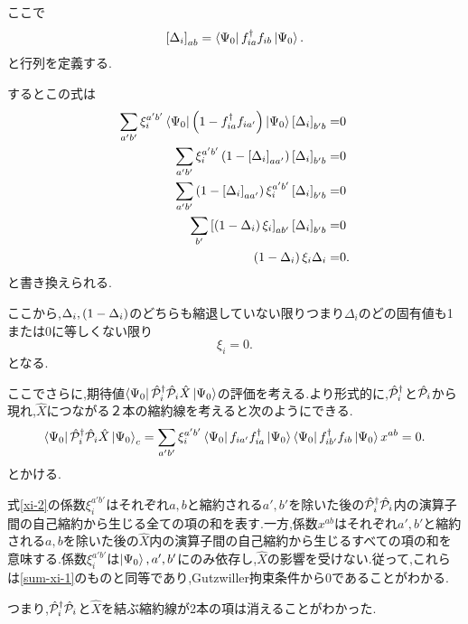 ここで
\begin{equation}
    \left[ \Delta_{i} \right]_{ab}=\Bra{\Psi_{0}}f^\dagger_{ia}f_{ib}\Ket{\Psi_{0}}.
\end{equation}
と行列を定義する.

するとこの式は
\begin{equation}
\begin{split}
    \sum_{a'b'}\xi^{a'b'}_{i}\Bra{\Psi_{0}}\left( 1-f^\dagger_{ia}f_{ia'} \right)\Ket{\Psi_{0}}\left[ \Delta_{i} \right]_{b'b}=&0 \\
    \sum_{a'b'}\xi^{a'b'}_{i}\left( 1-\left[ \Delta_{i} \right]_{aa'} \right)\left[ \Delta_{i} \right]_{b'b}=&0 \\
    \sum_{a'b'}\left( 1-\left[ \Delta_{i} \right]_{aa'} \right)\xi^{a'b'}_{i}\left[ \Delta_{i} \right]_{b'b}=&0 \\
    \sum_{b'}\left[ \left( 1-\Delta_{i} \right)\xi_{i} \right]_{ab'}\left[ \Delta_{i} \right]_{b'b}=&0\\
    \left( 1-\Delta_{i} \right)\xi_{i}\Delta_{i}=&0.
\end{split}
\end{equation}
と書き換えられる.

ここから,$\Delta_{i},\left( 1-\Delta_{i} \right)$のどちらも縮退していない限りつまり$\Delta_{i}$のどの固有値も1または0に等しくない限り
\begin{equation}
    \xi_{i}=0.  \label{xi-1}
\end{equation}
となる.

ここでさらに,期待値$\Bra{\Psi_{0}}\hat{\mathcal{P}}^\dagger_{i}\hat{\mathcal{P}}_{i}\hat{X}\Ket{\Psi_{0}}$の評価を考える.より形式的に,$\hat{\mathcal{P}}^\dagger_{i}$と$\hat{\mathcal{P}}_{i}$から現れ,$\hat{X}$につながる２本の縮約線を考えると次のようにできる.
\begin{equation}
    \Bra{\Psi_{0}}\hat{\mathcal{P}}^\dagger_{i}\hat{\mathcal{P}}_{i}\hat{X}\Ket{\Psi_{0}}_{c}=\sum_{a'b'}\xi^{a'b'}_{i}\Bra{\Psi_{0}}f_{ia'}f^\dagger_{ia}\Ket{\Psi_{0}}\Bra{\Psi_{0}}f^\dagger_{ib'}f_{ib}\Ket{\Psi_{0}}x^{ab}=0. \label{xi-2}
\end{equation}
とかける.

式\eqref{xi-2}の係数$\xi^{a'b'}_{i}$はそれぞれ$a,b$と縮約される$a',b'$を除いた後の$\hat{\mathcal{P}}^\dagger_{i}\hat{\mathcal{P}}_{i}$内の演算子間の自己縮約から生じる全ての項の和を表す.一方,係数$x^{ab}$はそれぞれ$a',b'$と縮約される$a,b$を除いた後の$\hat{X}$内の演算子間の自己縮約から生じるすべての項の和を意味する.係数$\xi^{a'b'}_{i}$は$\Ket{\Psi_{0}},a',b'$にのみ依存し,$\hat{X}$の影響を受けない.従って,これらは\eqref{sum-xi-1}のものと同等であり,Gutzwiller拘束条件から$0$であることがわかる.

つまり,$\hat{\mathcal{P}}^\dagger_{i}\hat{\mathcal{P}}_{i}$と$\hat{X}$を結ぶ縮約線が2本の項は消えることがわかった.

